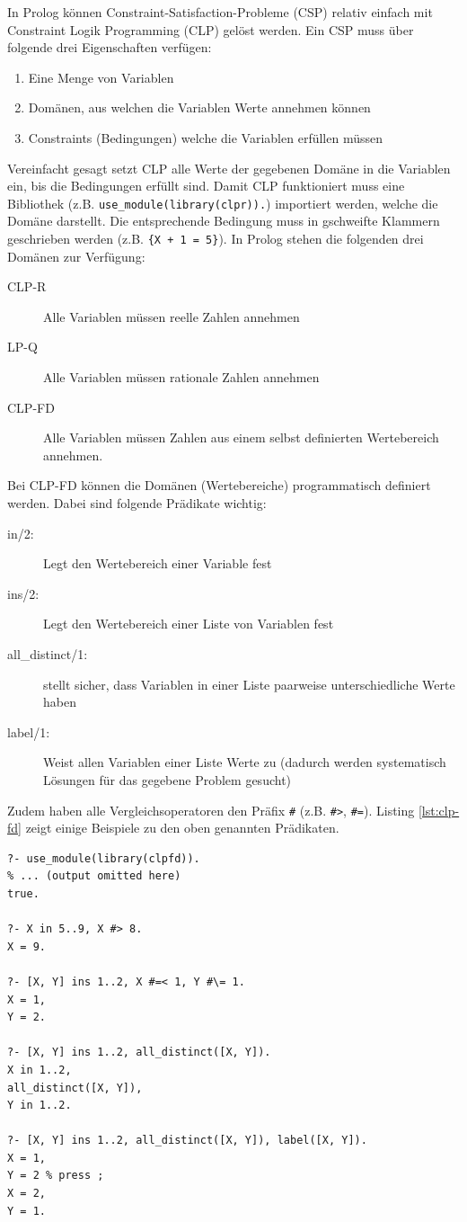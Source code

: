 In Prolog können Constraint-Satisfaction-Probleme (CSP) relativ einfach mit Constraint Logik Programming (CLP) gelöst werden. Ein CSP muss über folgende drei Eigenschaften verfügen:
\begin{enumerate}
	\item Eine Menge von Variablen
	\item Domänen, aus welchen die Variablen Werte annehmen können
	\item Constraints (Bedingungen) welche die Variablen erfüllen müssen
\end{enumerate}
Vereinfacht gesagt setzt CLP alle Werte der gegebenen Domäne in die Variablen ein, bis die Bedingungen erfüllt sind. Damit CLP funktioniert muss eine Bibliothek (z.B. \verb|use_module(library(clpr)).|) importiert werden, welche die Domäne darstellt. Die entsprechende Bedingung muss in gschweifte Klammern geschrieben werden (z.B. \verb|{X + 1 = 5}|). In Prolog stehen die folgenden drei Domänen zur Verfügung:
\begin{description}
	\item[CLP-R] Alle Variablen müssen reelle Zahlen annehmen
	\item[LP-Q] Alle Variablen müssen rationale Zahlen annehmen
	\item[CLP-FD] Alle Variablen müssen Zahlen aus einem selbst definierten Wertebereich annehmen.
\end{description}
Bei CLP-FD können die Domänen (Wertebereiche) programmatisch definiert werden. Dabei sind folgende Prädikate wichtig:
\begin{description}
	\item[in/2:] Legt den Wertebereich einer Variable fest
	\item[ins/2:] Legt den Wertebereich einer Liste von Variablen fest
	\item[all\_distinct/1:] stellt sicher, dass Variablen in einer Liste paarweise unterschiedliche Werte haben
	\item[label/1:] Weist allen Variablen einer Liste Werte zu (dadurch werden systematisch Lösungen für das gegebene Problem gesucht)
\end{description}
Zudem haben alle Vergleichsoperatoren den Präfix \verb|#| (z.B. \verb|#>|, \verb|#=|). Listing \ref{lst:clp-fd} zeigt einige Beispiele zu den oben genannten Prädikaten.
\begin{lstlisting}[caption=CLP-FD, label=lst:clp-fd]
?- use_module(library(clpfd)).
% ... (output omitted here)
true.

?- X in 5..9, X #> 8.
X = 9.

?- [X, Y] ins 1..2, X #=< 1, Y #\= 1.
X = 1,
Y = 2.

?- [X, Y] ins 1..2, all_distinct([X, Y]).
X in 1..2,
all_distinct([X, Y]),
Y in 1..2.

?- [X, Y] ins 1..2, all_distinct([X, Y]), label([X, Y]).
X = 1,
Y = 2 % press ;
X = 2,
Y = 1.
\end{lstlisting}


